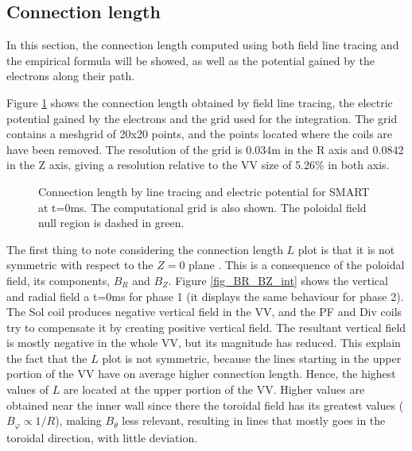 \documentclass[a4paper,12pt,oneside]{book}
\begin{document}
\subsection{Connection length}

In this section, the connection length computed using both field line tracing and the empirical formula will be showed, as well as the potential gained by the electrons along their path.

Figure \ref{fig_L_int} shows the connection length obtained by field line tracing, the electric potential gained by the electrons and the grid used for the integration. The grid contains a meshgrid of 20x20 points, and the points located where the coils are have been removed. The resolution of the grid is 0.034m in the R axis and 0.0842 in the Z axis, giving a resolution relative to the VV size of 5.26\% in both axis.

\begin{figure}[htbp]
\centering
{}
\hfill
{}

\hfill
{}

\centering
{}

\caption{Connection length by line tracing and electric potential for SMART at t=0ms. The computational grid is also shown. The poloidal field null region is dashed in green.}
\label{fig_L_int}
\end{figure}

The first thing to note considering the connection length $L$ plot is that it is not symmetric with respect to the $Z=0$ plane . This is a consequence of the poloidal field, its components, $B_R$ and $B_Z$. Figure \ref{fig_BR_BZ_int} shows the vertical and radial field a t=0ms for phase 1 (it displays the same behaviour for phase 2). The Sol coil produces negative vertical field in the VV, and the PF and Div coils try to compensate it by creating positive vertical field. The resultant vertical field is mostly negative in the whole VV, but its magnitude has reduced. This explain the fact that the $L$ plot is not symmetric, because the lines starting in the upper portion of the VV have on average higher connection length. Hence, the highest values of $L$ are located at the upper portion of the VV. Higher values are obtained near the inner wall since there the toroidal field has its greatest values ($B_\varphi \propto 1/R$), making $B_\theta$ less relevant, resulting in lines that mostly goes in the toroidal direction, with little deviation.
\end{document}
